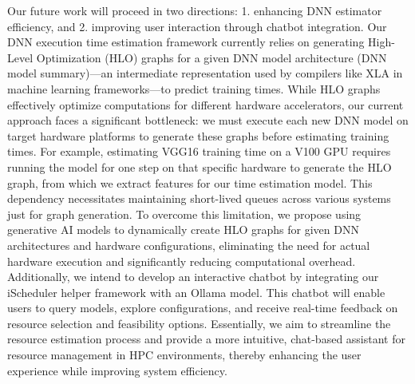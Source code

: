 Our future work will proceed in two directions: 1. enhancing DNN estimator efficiency, and 2. improving user interaction through chatbot integration. Our DNN execution time estimation framework currently relies on generating High-Level Optimization (HLO) graphs for a given DNN model architecture (DNN model summary)—an intermediate representation used by compilers like XLA in machine learning frameworks—to predict training times. While HLO graphs effectively optimize computations for different hardware accelerators, our current approach faces a significant bottleneck: we must execute each new DNN model on target hardware platforms to generate these graphs before estimating training times. For example, estimating VGG16 training time on a V100 GPU requires running the model for one step on that specific hardware to generate the HLO graph, from which we extract features for our time estimation model. This dependency necessitates maintaining short-lived queues across various systems just for graph generation. To overcome this limitation, we propose using generative AI models to dynamically create HLO graphs for given DNN architectures and hardware configurations, eliminating the need for actual hardware execution and significantly reducing computational overhead. Additionally, we intend to develop an interactive chatbot by integrating our iScheduler helper framework with an Ollama model. This chatbot will enable users to query models, explore configurations, and receive real-time feedback on resource selection and feasibility options. Essentially, we aim to streamline the resource estimation process and provide a more intuitive, chat-based assistant for resource management in HPC environments, thereby enhancing the user experience while improving system efficiency.


